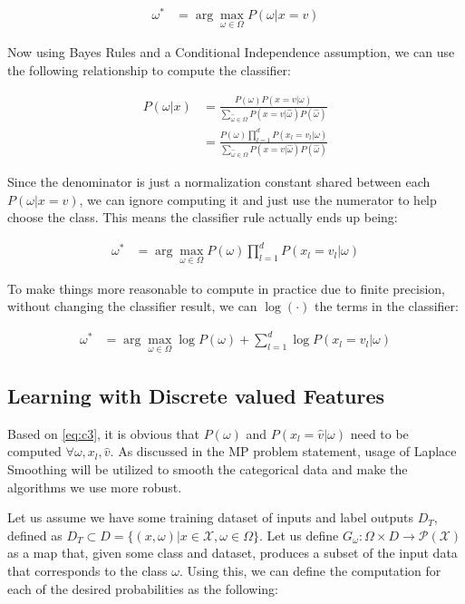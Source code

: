 \documentclass{article}[12pt]
\begin{document}
   \begin{align}
   \omega^* &= \arg \max_{\omega \in \Omega} P(\omega | x = v) \label{eq:c1}
   \end{align}
   
   Now using Bayes Rules and a Conditional Independence assumption, we can use the following relationship to compute the classifier:
   
   \begin{align*}
   P(\omega | x) &= \frac{P(\omega) P(x = v | \omega) }{\sum_{\hat{\omega} \in \Omega} P(x = v| \hat{\omega} ) P( \hat{\omega} )} \\
   &= \frac{ P(\omega) \prod_{l=1}^d P(x_l = v_l | \omega) }{\sum_{\hat{\omega} \in \Omega} P(x = v| \hat{\omega} ) P( \hat{\omega} )}
   \end{align*}
   
   Since the denominator is just a normalization constant shared between each $P(\omega | x = v)$, we can ignore computing it and just use the numerator to help choose the class. This means the classifier rule actually ends up being:
   
    \begin{align}
   \omega^* &= \arg \max_{\omega \in \Omega} P(\omega) \prod_{l=1}^d P(x_l = v_l | \omega) \label{eq:c2}
   \end{align}
   
   To make things more reasonable to compute in practice due to finite precision, without changing the classifier result, we can $\log\left(\cdot\right)$ the terms in the classifier:
   
   \begin{align}
   \omega^* &= \arg \max_{\omega \in \Omega} \log P(\omega) +  \sum_{l=1}^d \log P(x_l = v_l| \omega) \label{eq:c3}
   \end{align}
   
   
   \subsection{Learning with Discrete valued Features} \label{ssec:ldv}
   Based on \ref{eq:c3}, it is obvious that $P( \omega)$ and $P(x_l = \hat{v} | \omega)$ need to be computed $\forall \omega, x_l, \hat{v}$. As discussed in the MP problem statement, usage of Laplace Smoothing will be utilized to smooth the categorical data and make the algorithms we use more robust. 
   
   Let us assume we have some training dataset of inputs and label outputs $D_T$, defined as $D_T \subset D = \lbrace (x, \omega) | x \in \mathcal{X}, \omega \in \Omega \rbrace$. Let us define $G_{\omega}: \Omega \times D \rightarrow \mathcal{P}(\mathcal{X})$ as a map that, given some class and dataset, produces a subset of the input data that corresponds to the class $\omega$. Using this, we can define the computation for each of the desired probabilities as the following:
   
\end{document}
